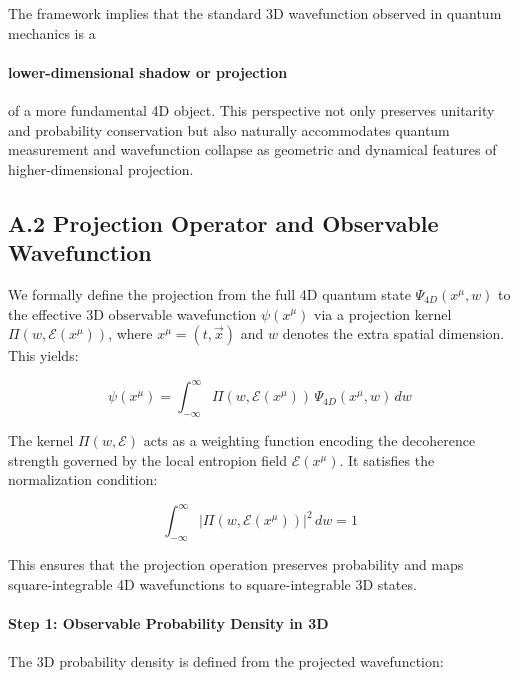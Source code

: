 \documentclass[12pt]{article}
\begin{document}
The framework implies that the standard 3D wavefunction observed in quantum mechanics is a \paragraph{lower-dimensional shadow or projection} of a more fundamental 4D object. This perspective not only preserves unitarity and probability conservation but also naturally accommodates quantum measurement and wavefunction collapse as geometric and dynamical features of higher-dimensional projection.



\subsection*{A.2 \quad Projection Operator and Observable Wavefunction}
\label{eq:A2}

We formally define the projection from the full 4D quantum state \(\Psi_{4D}(x^\mu, w)\) to the effective 3D observable wavefunction \(\psi(x^\mu)\) via a projection kernel \(\Pi(w, \mathcal{E}(x^\mu))\), where \(x^\mu = (t, \vec{x})\) and \(w\) denotes the extra spatial dimension. This yields:

\begin{equation}
\psi(x^\mu) = \int_{-\infty}^{\infty} \Pi(w, \mathcal{E}(x^\mu))\, \Psi_{4D}(x^\mu, w)\, dw
\label{eq:A2_proj_def}
\end{equation}

The kernel \(\Pi(w, \mathcal{E})\) acts as a weighting function encoding the decoherence strength governed by the local entropion field \(\mathcal{E}(x^\mu)\). It satisfies the normalization condition:

\begin{equation}
\int_{-\infty}^{\infty} |\Pi(w, \mathcal{E}(x^\mu))|^2\, dw = 1
\label{eq:A2_proj_norm}
\end{equation}

This ensures that the projection operation preserves probability and maps square-integrable 4D wavefunctions to square-integrable 3D states.

\vspace{1em}
\noindent
\paragraph{Step 1: Observable Probability Density in 3D}

The 3D probability density is defined from the projected wavefunction:
\end{document}
